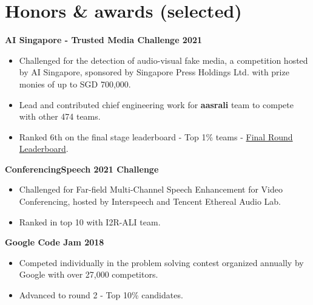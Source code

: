 \documentclass[10pt]{article}
\begin{document}
    \section{Honors \& awards (selected)}
    \vspace{-2mm}
        \begin{multicols}{1}
            \begin{flushleft}
                \textbf{AI Singapore - Trusted Media Challenge 2021}
            \end{flushleft}
        \end{multicols}
        \vspace{-5mm}
        \begin{itemize}[noitemsep]
            \item Challenged for the detection of audio-visual fake media, a competition hosted by AI Singapore, sponsored by Singapore Press Holdings Ltd. with prize monies of up to SGD 700,000.
            \item Lead and contributed chief engineering work for \textbf{aasrali} team to compete with other 474 teams.
            \item Ranked 6th on the final stage leaderboard - Top 1\% teams - \href{https://trustedmedia.aisingapore.org/competition/aisg/final-leaderboard/}{Final Round Leaderboard}.
        \end{itemize}

        \begin{multicols}{1}
            \begin{flushleft}
                \textbf{ConferencingSpeech 2021 Challenge}
            \end{flushleft}
        \end{multicols}
        \vspace{-5mm}
        \begin{itemize}[noitemsep]
            \item Challenged for Far-field Multi-Channel Speech Enhancement for Video Conferencing, hosted by Interspeech and Tencent Ethereal Audio Lab.
            \item Ranked in top 10 with I2R-ALI team.
        \end{itemize}
        \begin{multicols}{1}
            \begin{flushleft}
                \textbf{Google Code Jam 2018}
            \end{flushleft}
        \end{multicols}
        \vspace{-5mm}
        \begin{itemize}[noitemsep]
        \item Competed individually in the problem solving contest organized annually by Google with over 27,000 competitors.
        \item Advanced to round 2 - Top 10\% candidates.
        \end{itemize}
\end{document}
